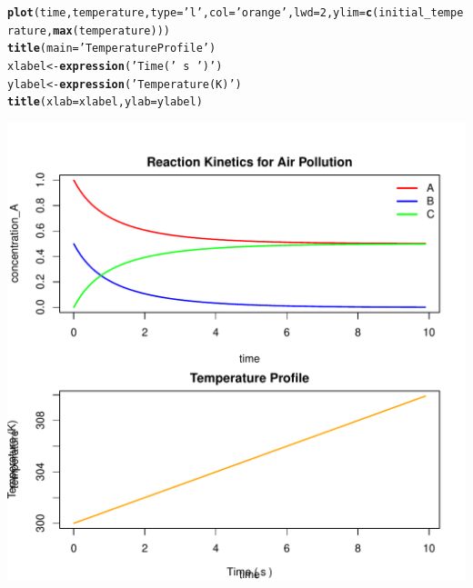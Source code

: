 \documentclass{tufte-handout}\usepackage[]{graphicx}\usepackage[]{xcolor}
\makeatletter
\def\maxwidth{ %
  \ifdim\Gin@nat@width>\linewidth
    \linewidth
  \else
    \Gin@nat@width
  \fi
}
\newcommand{\hlnum}[1]{\textcolor[rgb]{0.686,0.059,0.569}{#1}}%
\newcommand{\hlstr}[1]{\textcolor[rgb]{0.192,0.494,0.8}{#1}}%
\newcommand{\hlopt}[1]{\textcolor[rgb]{0,0,0}{#1}}%
\newcommand{\hlstd}[1]{\textcolor[rgb]{0.345,0.345,0.345}{#1}}%
\newcommand{\hlkwb}[1]{\textcolor[rgb]{0.69,0.353,0.396}{#1}}%
\newcommand{\hlkwc}[1]{\textcolor[rgb]{0.333,0.667,0.333}{#1}}%
\newcommand{\hlkwd}[1]{\textcolor[rgb]{0.737,0.353,0.396}{\textbf{#1}}}%
\newenvironment{kframe}{%
 \def\at@end@of@kframe{}%
 \ifinner\ifhmode%
  \def\at@end@of@kframe{\end{minipage}}%
  \begin{minipage}{\columnwidth}%
 \fi\fi%
 \def\FrameCommand##1{\hskip\@totalleftmargin \hskip-\fboxsep
 \colorbox{shadecolor}{##1}\hskip-\fboxsep
     \hskip-\linewidth \hskip-\@totalleftmargin \hskip\columnwidth}%
 \MakeFramed {\advance\hsize-\width
   \@totalleftmargin\z@ \linewidth\hsize
   \@setminipage}}%
 {\par\unskip\endMakeFramed%
 \at@end@of@kframe}
\newenvironment{knitrout}{}{} %
\makeatother
\begin{document}
\begin{knitrout}
\begin{kframe}
\begin{alltt}
\hlkwd{plot}\hlstd{(time, temperature,} \hlkwc{type} \hlstd{=} \hlstr{'l'}\hlstd{,} \hlkwc{col} \hlstd{=} \hlstr{'orange'}\hlstd{,} \hlkwc{lwd} \hlstd{=} \hlnum{2}\hlstd{,} \hlkwc{ylim} \hlstd{=} \hlkwd{c}\hlstd{(initial_temperature,} \hlkwd{max}\hlstd{(temperature)))}
\hlkwd{title}\hlstd{(}\hlkwc{main} \hlstd{=} \hlstr{'Temperature Profile'}\hlstd{)}
\hlstd{xlabel} \hlkwb{<-} \hlkwd{expression}\hlstd{(}\hlstr{'Time ('} \hlopt{~} \hlstd{s} \hlopt{~} \hlstr{')'}\hlstd{)}
\hlstd{ylabel} \hlkwb{<-} \hlkwd{expression}\hlstd{(}\hlstr{'Temperature (K)'}\hlstd{)}
\hlkwd{title}\hlstd{(}\hlkwc{xlab} \hlstd{= xlabel,} \hlkwc{ylab} \hlstd{= ylabel)}
\end{alltt}
\end{kframe}
\includegraphics[width=\maxwidth]{figure/unnamed-chunk-2-1} 
\end{knitrout}
\end{document}
